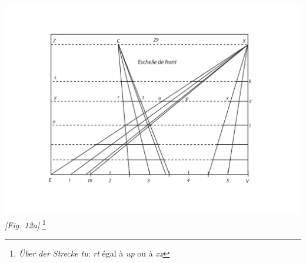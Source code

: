\begin{center}
\includegraphics[width=1\textwidth]{images/T29-Desargues_87_a}
\\\textit{[Fig. 12a]}
\footnote{\textit{\"{U}ber der Strecke tu}: \textit{rt} \'{e}gal \`{a} \textit{up} ou \`{a} \textit{xz}}
\end{center}
